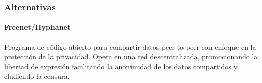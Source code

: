 

\subsubsection{Alternativas}
\paragraph{Freenet/Hyphanet}
Programa de código abierto para compartir datos peer-to-peer con enfoque en la protección de la privacidad. Opera en una red descentralizada, promocionando la libertad de expresión facilitando la anonimidad de los datos compartidos y eludiendo la censura.\cite{freenet}\cite{hyphanet}
